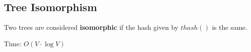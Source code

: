 \subsection{Tree Isomorphism}

Two trees are considered \textbf{isomorphic} if the hash given by $thash()$ is the same.

Time: $O(V \cdot \log{V})$
